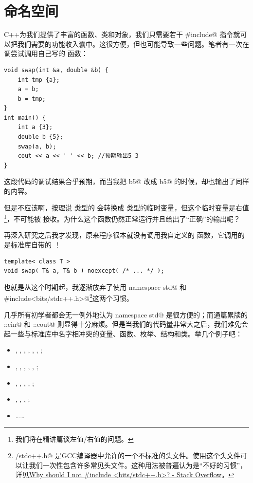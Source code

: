 \section{命名空间}
C++为我们提供了丰富的函数、类和对象，我们只需要若干 \lstinline@#include@ 指令就可以把我们需要的功能收入囊中。这很方便，但也可能导致一些问题。笔者有一次在调尝试调用自己写的 \lstinline@swap@ 函数：
\begin{lstlisting}
void swap(int &a, double &b) {
    int tmp {a};
    a = b;
    b = tmp;
}
int main() {
    int a {3};
    double b {5};
    swap(a, b);
    cout << a << ' ' << b; //预期输出5 3
}
\end{lstlisting}
这段代码的调试结果合乎预期，而当我把 \lstinline@double b{5}@ 改成 \lstinline@int b{5}@ 的时候，却也输出了同样的内容。\par
但是不应该啊，按理说 \lstinline@int@ 类型的 \lstinline@b@ 会转换成 \lstinline@double@ 类型的临时变量，但这个临时变量是右值\footnote{我们将在精讲篇谈左值/右值的问题。}，不可能被 \lstinline@swap@ 接收。为什么这个函数仍然正常运行并且给出了``正确''的输出呢？\par
再深入研究之后我才发现，原来程序很本就没有调用我自定义的 \lstinline@swap@ 函数，它调用的是标准库自带的 \lstinline@swap@！
\begin{lstlisting}
template< class T >
void swap( T& a, T& b ) noexcept( /* ... */ );
\end{lstlisting}
也就是从这个时期起，我逐渐放弃了使用 \lstinline@using namespace std@ 和 \lstinline@#include<bits/stdc++.h>@\footnote{\lstinline@bits/stdc++.h@ 是GCC编译器中允许的一个不标准的头文件。使用这个头文件可以让我们一次性包含许多常见头文件。这种用法被普遍认为是``不好的习惯''，详见\href{https://stackoverflow.com/questions/31816095/why-should-i-not-include-bits-stdc-h}{Why should I not \#include <bits/stdc++.h>? - Stack Overflow}。}这两个习惯。\par
几乎所有初学者都会无一例外地认为 \lstinline@using namespace std@ 是很方便的；而通篇累牍的 \lstinline@std::cin@ 和 \lstinline@std::cout@ 则显得十分麻烦。但是当我们的代码量非常大之后，我们难免会起一些与标准库中名字相冲突的变量、函数、枚举、结构和类。举几个例子吧：
\begin{itemize}
    \item \lstinline@list@, \lstinline@map@, \lstinline@array@, \lstinline@queue@, \lstinline@set@, \lstinline@string@, \lstinline@pair@;
    \item \lstinline@copy@, \lstinline@find@, \lstinline@move@, \lstinline@search@, \lstinline@count@, \lstinline@sample@;
    \item \lstinline@next@, \lstinline@begin@, \lstinline@end@, \lstinline@data@, \lstinline@size@;
    \item \lstinline@function@, \lstinline@future@, \lstinline@thread@, \lstinline@yield@;
    \item \ldots\ldots
\end{itemize}
